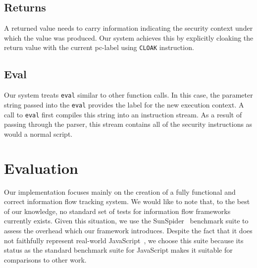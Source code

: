 \subsection{Returns}
\label{sec:returns}
A returned value needs to carry information indicating the security context under which the value was produced.
Our system achieves this by explicitly cloaking the return value with the current pc-label using \texttt{CLOAK} instruction.

\subsection{Eval}
\label{sec:eval}
Our system treats \texttt{eval} similar to other function calls.
In this case, the parameter string passed into the \texttt{eval} provides the label for the new execution context.
A call to \texttt{eval} first compiles this string into an instruction stream.
As a result of passing through the parser, this stream contains all of the security instructions as would a normal script.



\section{Evaluation}
\label{sec:evaluation}

%

Our implementation focuses mainly on the creation of a fully functional and correct information flow tracking system.
We would like to note that, to the best of our knowledge, no standard set of tests for information flow frameworks currently exists.
Given this situation, we use the SunSpider~\cite{sunspider} benchmark suite to assess the overhead which our framework introduces.
Despite the fact that it does not faithfully represent real-world JavaScript~\cite{jsmeter}, we choose this suite because its status as the standard benchmark suite for JavaScript makes it suitable for comparisons to other work.


